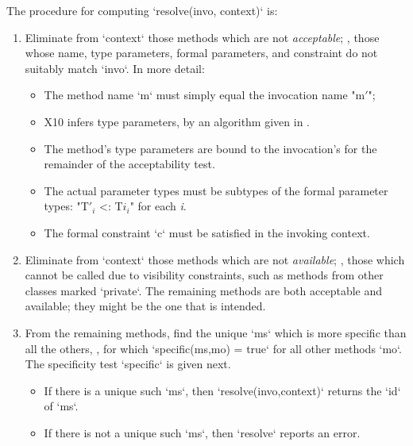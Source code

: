 The procedure for computing \xcd`resolve(invo, context)` is: 
\begin{enumerate}
\item Eliminate from \xcd`context` those methods which are not {\em
      acceptable}; \viz, those whose name, type parameters, formal parameters,
      and constraint do not suitably match \xcd`invo`.  In more detail:
      \begin{itemize}
      \item The method name \xcd`m` must simply equal the invocation name \xcdmath"m$'$";
      \item X10 infers type parameters, by an algorithm given in .
      \item The method's type parameters are bound to the invocation's for the
            remainder of the acceptability test.
      \item The actual parameter types must be subtypes of the formal
            parameter types:  \xcdmath"T$'_i$ <: T$i_i$" for each {\em i}. 
      \item The formal constraint \xcd`c` must be satisfied in the invoking
            context. 
      \end{itemize}
\item Eliminate from \xcd`context` those methods which are not {\em
      available}; \viz, those which cannot be called due to visibility
      constraints, such as methods from other classes marked \xcd`private`.
      The remaining methods are both acceptable and available; they might be
      the one that is intended.
\item From the remaining methods, find the unique \xcd`ms` which is more specific than all the
      others, \viz, for which \xcd`specific(ms,mo) = true` for all other
      methods \xcd`mo`.
      The specificity test \xcd`specific` is given next.
      \begin{itemize}
      \item If there is a unique such \xcd`ms`, then
            \xcd`resolve(invo,context)` returns the \xcd`id` of \xcd`ms`.  
      \item If there is not a unique such \xcd`ms`, then \xcd`resolve` reports
            an error.
      \end{itemize}

\end{enumerate}

